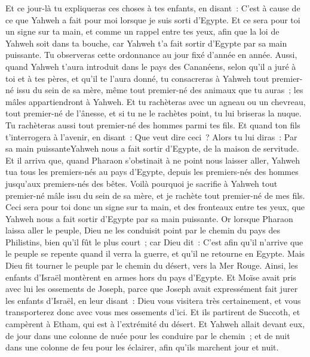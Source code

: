 \begin{multicols}{2}
Et ce jour-là tu expliqueras ces choses à tes enfants, en disant~: C'est à cause de ce que Yahweh a fait pour moi lorsque je suis sorti d'Egypte.
Et ce sera pour toi un signe sur ta main, et comme un rappel entre tes yeux, afin que la loi de Yahweh soit dans ta bouche, car Yahweh t'a fait sortir d'Egypte par sa main puissante.
Tu observeras cette ordonnance au jour fixé d'année en année.
Aussi, quand Yahweh t'aura introduit dans le pays des Cananéens, selon qu'il a juré à toi et à tes pères, et qu'il te l'aura donné,
tu consacreras à Yahweh tout premier-né issu du sein de sa mère, même tout premier-né des animaux que tu auras~; les mâles appartiendront à Yahweh.
Et tu rachèteras avec un agneau ou un chevreau, tout premier-né de l'ânesse, et si tu ne le rachètes point, tu lui briseras la nuque. Tu rachèteras aussi tout premier-né des hommes parmi tes fils.
Et quand ton fils t'interrogera à l'avenir, en disant~: Que veut dire ceci~? Alors tu lui diras~: Par sa main puissanteYahweh nous a fait sortir d'Egypte, de la maison de servitude.
Et il arriva que, quand Pharaon s'obstinait à ne point nous laisser aller, Yahweh tua tous les premiers-nés au pays d'Egypte, depuis les premiers-nés des hommes jusqu'aux premiers-nés des bêtes. Voilà pourquoi je sacrifie à Yahweh tout premier-né mâle issu du sein de sa mère, et je rachète tout premier-né de mes fils.
Ceci sera pour toi donc un signe sur ta main, et des fronteaux entre tes yeux, que Yahweh nous a fait sortir d'Egypte par sa main puissante.
Or lorsque Pharaon laissa aller le peuple, Dieu ne les conduisit point par le chemin du pays des Philistins, bien qu'il fût le plus court~; car Dieu dit~: C'est afin qu'il n'arrive que le peuple se repente quand il verra la guerre, et qu'il ne retourne en Egypte.
Mais Dieu fit tourner le peuple par le chemin du désert, vers la Mer Rouge. Ainsi, les enfants d'Israël montèrent en armes hors du pays d'Egypte.
Et Moïse avait pris avec lui les ossements de Joseph, parce que Joseph avait expressément fait jurer les enfants d'Israël, en leur disant~: Dieu vous visitera très certainement, et vous transporterez donc avec vous mes ossements d'ici.
Et ils partirent de Succoth, et campèrent à Etham, qui est à l'extrémité du désert.
Et Yahweh allait devant eux, de jour dans une colonne de nuée pour les conduire par le chemin~; et de nuit dans une colonne de feu pour les éclairer, afin qu'ils marchent jour et nuit.

\end{multicols}

